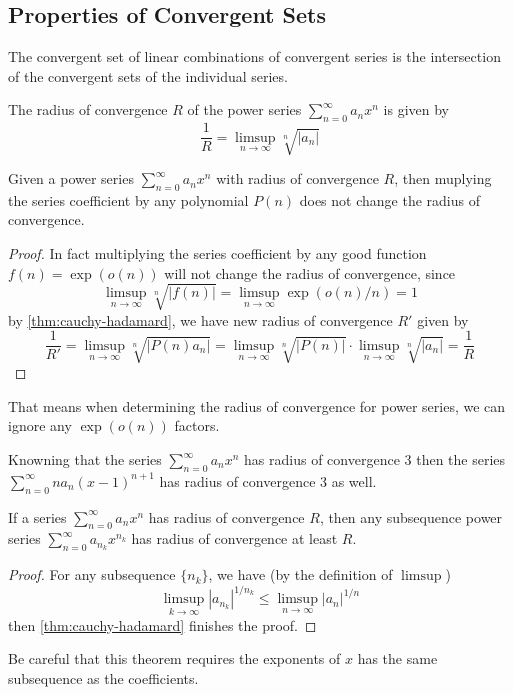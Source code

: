 \documentclass{overview}
\newcommand{\sumOInf}{\sum_{n=0}^{\infty}}
\begin{document}
\subsection{Properties of Convergent Sets}
The convergent set of linear combinations of convergent series is the intersection
of the convergent sets of the individual series.

\begin{theorem}
	\label{thm:cauchy-hadamard}
	The radius of convergence $R$ of the power series $\sum_{n=0}^{\infty} a_n x^n$ is given by
	\[
		\frac{1}{R} = \limsup_{n\to\infty} \sqrt[n]{|a_n|}
	\] 
\end{theorem}
\begin{theorem}
	Given a power series $\sum_{n=0}^{\infty} a_n x^n$ with radius of convergence $R$, then
	muplying the series coefficient by any polynomial $P(n)$ does not change the radius of convergence.
\end{theorem}
\begin{proof}
	In fact multiplying the series coefficient by
	any good function $f(n) = \exp(o(n))$ will not change the radius of convergence,
	since
	\[
		\limsup_{n\to\infty} \sqrt[n]{|f(n)|} = \limsup_{n\to\infty} \exp(o(n)/n) = 1
	\] 
	by \ref{thm:cauchy-hadamard}, we have new radius of convergence $R'$ given by
	\[
		\frac{1}{R'} = \limsup_{n\to\infty} \sqrt[n]{|P(n) a_n|} 
		= \limsup_{n\to\infty} \sqrt[n]{|P(n)|} \cdot \limsup_{n\to\infty} \sqrt[n]{|a_n|}
		= \frac{1}{R}
	\] 
\end{proof}
\begin{remark}
	That means when determining the radius of convergence for power series, we can
	ignore any $\exp(o(n))$ factors.
\end{remark}
\begin{example}
	Knowning that the series $\sumOInf a_n x^n$ has radius of convergence $3$ then
	the series $\sumOInf n a_n (x-1)^{n+1}$ has radius of convergence $3$ as well.
\end{example}

\begin{theorem}
	If a series $\sumOInf a_n x^n$ has radius of convergence $R$, then any subsequence
	power series $\sumOInf a_{n_k} x^{n_k}$ has radius of convergence at least $R$.
\begin{proof}
	For any subsequence $\{n_k\}$, we have (by the definition of $\limsup$)
	\[
		\limsup_{k\to\infty} |a_{n_k}|^{1/n_k} \leq \limsup_{n\to\infty} |a_n|^{1/n}
	\] 
	then \ref{thm:cauchy-hadamard} finishes the proof.
\end{proof}
\end{theorem}
\begin{remark}
	Be careful that this theorem requires the exponents of $x$ has the same
	subsequence as the coefficients.
\end{remark}
\end{document}
